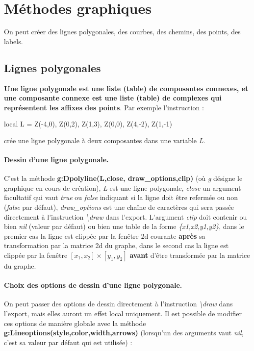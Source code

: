 \section{Méthodes graphiques}

On peut créer des lignes polygonales, des courbes, des chemins, des points, des labels.


\subsection{Lignes polygonales}

\textbf{Une ligne polygonale est une liste (table) de composantes connexes, et une composante connexe est une liste (table) de complexes qui représentent les affixes des points}. Par exemple l'instruction :
\begin{Luacode}
local L = { {Z(-4,0), Z(0,2), Z(1,3)}, {Z(0,0), Z(4,-2), Z(1,-1)} }
\end{Luacode}
crée une ligne polygonale à deux composantes dans une variable \emph{L}.

\paragraph{Dessin d'une ligne polygonale.}

C'est la méthode \textbf{g:Dpolyline(L,close, draw\_options,clip)} (où \emph{g} désigne le graphique en cours de création), \emph{L} est une ligne polygonale, \emph{close} un argument facultatif qui vaut \emph{true} ou \emph{false} indiquant si la ligne doit être refermée ou non (\emph{false} par défaut), \emph{draw\_options} est une chaîne de caractères qui sera passée directement à l'instruction \emph{\textbackslash draw} dans l'export. L'argument \emph{clip} doit contenir ou bien \emph{nil} (valeur par défaut) ou bien une table de la forme \emph{\{x1,x2,y1,y2\}},  dans le premier cas la ligne est clippée par la fenêtre 2d courante \textbf{après} sa transformation par la matrice 2d du graphe, dans le second cas la ligne est clippée par la fenêtre $[x_1,x_2]\times[y_1,y_2]$ \textbf{avant} d'être transformée par la matrice du graphe.

\paragraph{Choix des options de dessin d'une ligne polygonale.}

On peut passer des options de dessin directement à l'instruction \emph{\textbackslash draw} dans l'export, mais elles auront un effet local uniquement. Il est possible de modifier ces options de manière globale avec la méthode \textbf{g:Lineoptions(style,color,width,arrows)} (lorsqu'un des arguments vaut \emph{nil}, c'est sa valeur par défaut qui est utilisée) :

